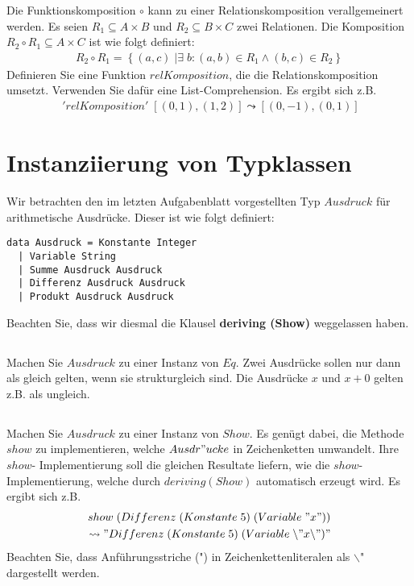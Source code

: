 \documentclass{article}
\begin{document}
Die Funktionskomposition $\circ$ kann zu einer Relationskomposition verallgemeinert werden.
Es seien $R_1 \subseteq A \times B$ und $R_2 \subseteq B \times C$ zwei Relationen. Die Komposition $R_2 \circ R_1 \subseteq A \times C$
ist wie folgt definiert:
\begin{align*}
R_2 \circ R_1 = \left\{(a, c)\;| \exists\;b : (a, b) \in R_1 \wedge (b, c) \in R_2 \right\}
\end{align*}
Definieren Sie eine Funktion $relKomposition$, die die Relationskomposition umsetzt.
Verwenden Sie dafür eine List-Comprehension. Es ergibt sich z.B.
\begin{align*}
[(4,-2), (1,-1), (0, 0), (1, 1), (4, 2)] \;'relKomposition' \;[(0, 1), (1, 2)] \leadsto [(0,-1), (0, 1)]
\end{align*}
\section{Instanziierung von Typklassen}
Wir betrachten den im letzten Aufgabenblatt vorgestellten Typ $Ausdruck$ für
arithmetische Ausdrücke. Dieser ist wie folgt definiert:
\begin{lstlisting}
data Ausdruck = Konstante Integer
  | Variable String
  | Summe Ausdruck Ausdruck
  | Differenz Ausdruck Ausdruck
  | Produkt Ausdruck Ausdruck
\end{lstlisting}
Beachten Sie, dass wir diesmal die Klausel \textbf{deriving (Show)} weggelassen haben.
\subsection{}
Machen Sie $Ausdruck$ zu einer Instanz von $Eq$. Zwei Ausdrücke
sollen nur dann als gleich gelten, wenn sie strukturgleich sind. Die Ausdrücke
$x$ und $x + 0$ gelten z.B. als ungleich.
\subsection{}
Machen Sie $Ausdruck$ zu einer Instanz von $Show$. Es genügt dabei, die Methode $show$
zu implementieren, welche $Ausdr"ucke$ in Zeichenketten umwandelt. Ihre $show$-
Implementierung soll die gleichen Resultate liefern, wie die $show$-Implementierung,
welche durch $deriving(Show)$ automatisch erzeugt wird. Es ergibt sich z.B.
\begin{align*}
show\; (Differenz\; (Konstante\; 5) \;(Variable \;"x"))\\
\leadsto "Differenz\; (Konstante\; 5)\; (Variable\; \backslash "x\backslash")"
\end{align*}
Beachten Sie, dass Anführungsstriche (") in Zeichenkettenliteralen als $\backslash$" dargestellt
werden.
\end{document}
